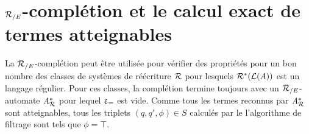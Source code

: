 





\section{${\mathcal R_{/E}}$-complétion et le calcul exact de termes atteignables}
\label{sec:exact}
La ${\mathcal R_{/E}}$-complétion peut être utilisée pour vérifier des propriétés pour un bon nombre des 
classes de systèmes de réécriture $\mathcal R$ pour lesquels $\mathcal R^*(\mathcal{L}(\mathit A))$ est un langage régulier. 
Pour ces classes, la complétion termine toujours avec un ${\mathcal R_{/E}}$-automate ${\mathit A}_{\mathcal R}^*$ pour lequel
$\upvarepsilon_{=}$ est vide. Comme tous les termes reconnus par ${\mathit A}_{\mathcal R}^*$ sont atteignables, tous les triplets
$(q,q',\phi)\in S$ calculés par le l'algorithme de filtrage sont tels que $\phi=\top$.

